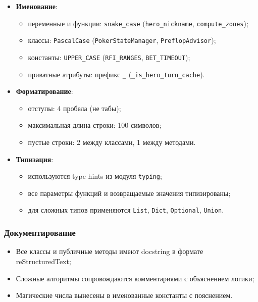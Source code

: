\begin{itemize}
    \item \textbf{Именование}:
    \begin{itemize}
        \item переменные и функции: \texttt{snake\_case} (\texttt{hero\_nickname}, \texttt{compute\_zones});
        \item классы: \texttt{PascalCase} (\texttt{PokerStateManager}, \texttt{PreflopAdvisor});
        \item константы: \texttt{UPPER\_CASE} (\texttt{RFI\_RANGES}, \texttt{BET\_TIMEOUT});
        \item приватные атрибуты: префикс \texttt{\_} (\texttt{\_is\_hero\_turn\_cache}).
    \end{itemize}
    
    \item \textbf{Форматирование}:
    \begin{itemize}
        \item отступы: 4 пробела (не табы);
        \item максимальная длина строки: 100 символов;
        \item пустые строки: 2 между классами, 1 между методами.
    \end{itemize}
    
    \item \textbf{Типизация}:
    \begin{itemize}
        \item используются type hints из модуля \texttt{typing};
        \item все параметры функций и возвращаемые значения типизированы;
        \item для сложных типов применяются \texttt{List}, \texttt{Dict}, \texttt{Optional}, \texttt{Union}.
    \end{itemize}
\end{itemize}

\subsubsection*{Документирование}

\begin{itemize}
    \item Все классы и публичные методы имеют docstring в формате reStructuredText;
    \item Сложные алгоритмы сопровождаются комментариями с объяснением логики;
    \item Магические числа вынесены в именованные константы с пояснением.
\end{itemize}


